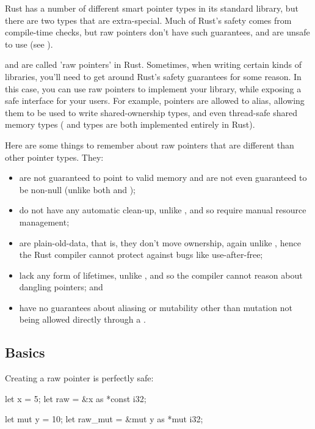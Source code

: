 Rust has a number of different smart pointer types in its standard library, but there are two types that are extra-special. Much 
of Rust's safety comes from compile-time checks, but raw pointers don't have such guarantees, and are unsafe to use (see 
).

\blank

 and  are called 'raw pointers' in Rust. Sometimes, when writing certain kinds of libraries, you'll 
need to get around Rust's safety guarantees for some reason. In this case, you can use raw pointers to implement your library, 
while exposing a safe interface for your users. For example, \code{*} pointers are allowed to alias, allowing them to be used to 
write shared-ownership types, and even thread-safe shared memory types ( and  types are both implemented 
entirely in Rust).

\blank

Here are some things to remember about raw pointers that are different than other pointer types. They:

\begin{itemize}
  \item{are not guaranteed to point to valid memory and are not even guaranteed to be non-null (unlike both  and \code{\&});}
  \item{do not have any automatic clean-up, unlike , and so require manual resource management;}
  \item{are plain-old-data, that is, they don't move ownership, again unlike , hence the Rust compiler cannot protect against 
      bugs like use-after-free;}
  \item{lack any form of lifetimes, unlike \code{\&}, and so the compiler cannot reason about dangling pointers; and}
  \item{have no guarantees about aliasing or mutability other than mutation not being allowed directly through a .}
\end{itemize}

\subsection*{Basics}

Creating a raw pointer is perfectly safe:

\begin{rustc}
let x = 5;
let raw = &x as *const i32;

let mut y = 10;
let raw_mut = &mut y as *mut i32;
\end{rustc}

